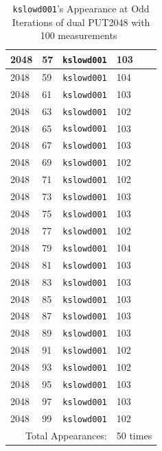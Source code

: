 \documentclass[10pt]{article}
\begin{document}
\begin{table}[htp!]
{\begin{tabular}{|l|l|l|l|}
2048 & 57 & {\tt kslowd001} & 103 \\ \hline
2048 & 59 & {\tt kslowd001} & 104 \\ \hline
2048 & 61 & {\tt kslowd001} & 103 \\ \hline
2048 & 63 & {\tt kslowd001} & 102 \\ \hline
2048 & 65 & {\tt kslowd001} & 103 \\ \hline
2048 & 67 & {\tt kslowd001} & 103 \\ \hline
2048 & 69 & {\tt kslowd001} & 102 \\ \hline
2048 & 71 & {\tt kslowd001} & 102 \\ \hline
2048 & 73 & {\tt kslowd001} & 103 \\ \hline
2048 & 75 & {\tt kslowd001} & 103 \\ \hline
2048 & 77 & {\tt kslowd001} & 102 \\ \hline
2048 & 79 & {\tt kslowd001} & 104 \\ \hline
2048 & 81 & {\tt kslowd001} & 103 \\ \hline
2048 & 83 & {\tt kslowd001} & 103 \\ \hline
2048 & 85 & {\tt kslowd001} & 103 \\ \hline
2048 & 87 & {\tt kslowd001} & 103 \\ \hline
2048 & 89 & {\tt kslowd001} & 103 \\ \hline
2048 & 91 & {\tt kslowd001} & 102 \\ \hline
2048 & 93 & {\tt kslowd001} & 102 \\ \hline
2048 & 95 & {\tt kslowd001} & 103 \\ \hline
2048 & 97 & {\tt kslowd001} & 103 \\ \hline
2048 & 99 & {\tt kslowd001} & 102 \\ \hline
\multicolumn{3}{|r|}{Total Appearances:} & 50 times\\ \hline
  \end{tabular}
  }
 \caption{{\tt kslowd001}'s Appearance at Odd Iterations of dual PUT2048 with 100 measurements~\label{fig:rc_dual_put_2048_odd1}}
\end{table}
\end{document}
